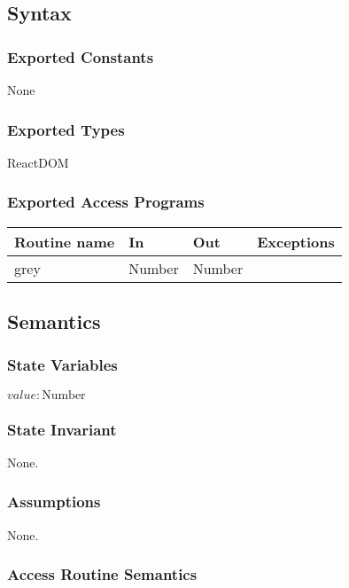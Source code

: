 \documentclass[12pt, titlepage]{article}
\begin{document}
\subsection{Syntax}

\subsubsection{Exported Constants}

None

\subsubsection{Exported Types}

ReactDOM

\subsubsection{Exported Access Programs}

\begin{tabular}{| l | l | l | l |}
  \hline
  \textbf{Routine name} & \textbf{In} & \textbf{Out} & \textbf{Exceptions}\\
  \hline
  grey & Number & Number & ~\\
  \hline
\end{tabular}

\subsection{Semantics}

\subsubsection{State Variables}

$\mathit{value}: \text{Number}$

\subsubsection{State Invariant}

None.

\subsubsection{Assumptions}

None.

\subsubsection{Access Routine Semantics}
\end{document}

